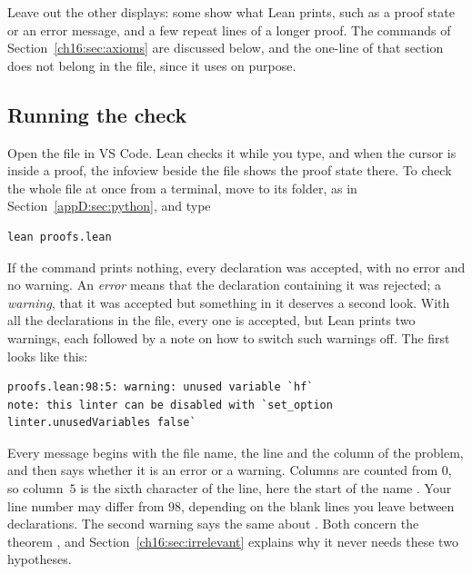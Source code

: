 Leave out the other displays: some show what Lean prints, such as a proof state or an error message, and a few repeat lines of a longer proof. The  commands of Section~\ref{ch16:sec:axioms} are discussed below, and the one-line  of that section does not belong in the file, since it uses  on purpose.

\subsection*{Running the check}
Open the file in VS Code. Lean checks it while you type, and when the cursor is inside a proof, the infoview beside the file shows the proof state there. To check the whole file at once from a terminal, move to its folder, as in Section~\ref{appD:sec:python}, and type
\par\noindent\begin{minipage}{\linewidth}
\begin{lstlisting}
lean proofs.lean
\end{lstlisting}
\end{minipage}\par
If the command prints nothing, every declaration was accepted, with no error and no warning. An \emph{error} means that the declaration containing it was rejected; a \emph{warning}, that it was accepted but something in it deserves a second look. With all the declarations in the file, every one is accepted, but Lean prints two warnings, each followed by a note on how to switch such warnings off. The first looks like this:
\par\noindent\begin{minipage}{\linewidth}
\begin{lstlisting}
proofs.lean:98:5: warning: unused variable `hf`
note: this linter can be disabled with `set_option linter.unusedVariables false`
\end{lstlisting}
\end{minipage}\par
Every message begins with the file name, the line and the column of the problem, and then says whether it is an error or a warning. Columns are counted from $0$, so column~$5$ is the sixth character of the line, here the start of the name . Your line number may differ from $98$, depending on the blank lines you leave between declarations. The second warning says the same about . Both concern the theorem , and Section~\ref{ch16:sec:irrelevant} explains why it never needs these two hypotheses.

